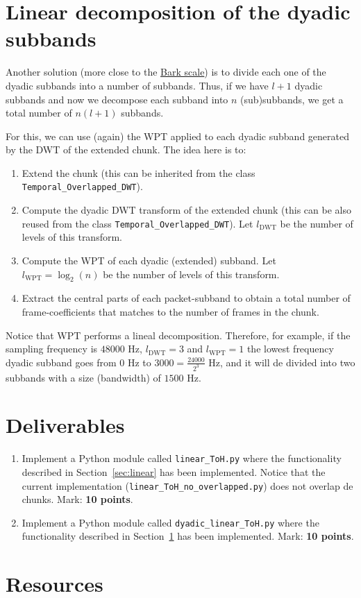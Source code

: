 \section{Linear decomposition of the dyadic subbands}
\label{sec:dyadic-linear}
Another solution (more close to the
\href{https://en.wikipedia.org/wiki/Bark_scale}{Bark scale}) is to
divide each one of the dyadic subbands into a number of
subbands. Thus, if we have $l+1$ dyadic subbands and now we decompose
each subband into $n$ (sub)subbands, we get a total number of $n(l+1)$
subbands.

For this, we can use (again) the WPT applied to each dyadic subband
generated by the DWT of the extended chunk. The idea here is to:
\begin{enumerate}
\item Extend the chunk (this can be inherited from the class
  \verb|Temporal_Overlapped_DWT|).
\item Compute the dyadic DWT transform of the extended chunk (this can
  be also reused from the class \verb|Temporal_Overlapped_DWT|). Let
  $l_{\text{DWT}}$ be the number of levels of this transform.
\item Compute the WPT of each dyadic (extended) subband. Let
  $l_{\text{WPT}}=\log_2(n)$ be the number of levels of this
  transform.
\item Extract the central parts of each packet-subband to obtain a
  total number of frame-coefficients that matches to the number of frames in
  the chunk.
\end{enumerate}
  
Notice that WPT performs a lineal decomposition. Therefore, for
example, if the sampling frequency is $48000$ Hz, $l_{\text{DWT}}=3$
and $l_{\text{WPT}}=1$ the lowest frequency dyadic subband goes from
$0$ Hz to $3000=\frac{24000}{2^3}$ Hz, and it will de divided into two
subbands with a size (bandwidth) of $1500$ Hz.

\section{Deliverables}

\begin{enumerate}
\item Implement a Python module called \verb|linear_ToH.py| where the
  functionality described in Section~\ref{sec:linear} has been
  implemented. Notice that the current implementation
  (\texttt{linear\_ToH\_no\_overlapped.py}) does not overlap de
  chunks. Mark: \textbf{10 points}.
\item Implement a Python module called \verb|dyadic_linear_ToH.py|
  where the functionality described in Section~\ref{sec:dyadic-linear}
  has been implemented. Mark: \textbf{10 points}.
\end{enumerate}

\section{Resources}



